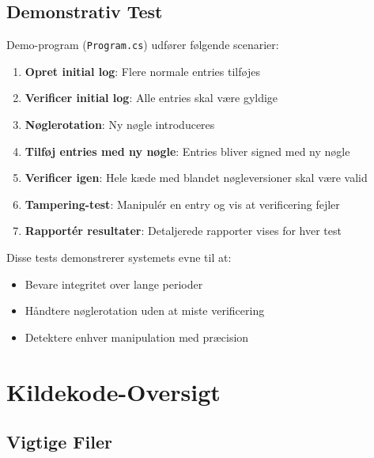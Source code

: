 \documentclass[12pt, a4paper, danish]{article}
\begin{document}
\subsection{Demonstrativ Test}

Demo-program (\texttt{Program.cs}) udfører følgende scenarier:

\begin{enumerate}
    \item \textbf{Opret initial log}: Flere normale entries tilføjes
    \item \textbf{Verificer initial log}: Alle entries skal være gyldige
    \item \textbf{Nøglerotation}: Ny nøgle introduceres
    \item \textbf{Tilføj entries med ny nøgle}: Entries bliver signed med ny nøgle
    \item \textbf{Verificer igen}: Hele kæde med blandet nøgleversioner skal være valid
    \item \textbf{Tampering-test}: Manipulér en entry og vis at verificering fejler
    \item \textbf{Rapportér resultater}: Detaljerede rapporter vises for hver test
\end{enumerate}

Disse tests demonstrerer systemets evne til at:
\begin{itemize}
    \item Bevare integritet over lange perioder
    \item Håndtere nøglerotation uden at miste verificering
    \item Detektere enhver manipulation med præcision
\end{itemize}

\newpage
\section{Kildekode-Oversigt}

\subsection{Vigtige Filer}
\end{document}
